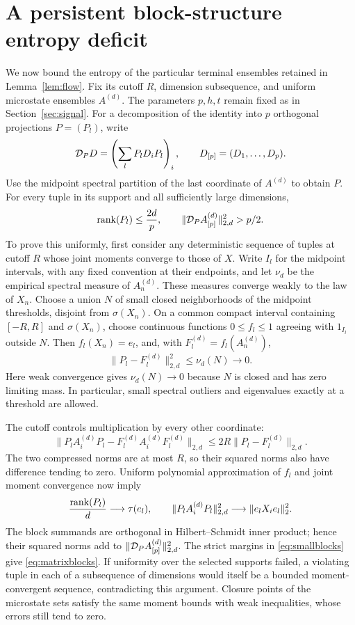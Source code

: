 \section{A persistent block-structure entropy deficit}\label{sec:blocks}

We now bound the entropy of the particular terminal ensembles retained
in Lemma~\ref{lem:flow}. Fix its cutoff $R$, dimension subsequence, and
uniform microstate ensembles $A^{(d)}$. The parameters $p,h,t$ remain
fixed as in Section~\ref{sec:signal}. For a decomposition of the identity
into $p$ orthogonal projections $P=(P_l)$, write
\[
 \mathcal D_P D=\left(\sum_l P_lD_iP_l\right)_i,
 \qquad D_{[p]}=(D_1,\ldots,D_p).
\]
Use the midpoint spectral partition of the last coordinate of $A^{(d)}$
to obtain $P$. For every tuple in its support and all sufficiently large
dimensions,
\begin{equation}\label{eq:matrixblocks}
 \operatorname{rank}(P_l)\leq\frac{2d}{p},\qquad
 \|\mathcal D_P A^{(d)}_{[p]}\|_{2,d}^2>p/2.
\end{equation}
To prove this uniformly, first consider any deterministic sequence of
tuples at cutoff $R$ whose joint moments converge to those of $X$.
Write $I_l$ for the midpoint intervals, with any fixed convention at
their endpoints, and let $\nu_d$ be the empirical spectral measure of
$A_n^{(d)}$. These measures converge weakly to the law of $X_n$.
Choose a union $N$ of small closed neighborhoods of the midpoint
thresholds, disjoint from $\sigma(X_n)$. On a common compact interval containing
$[-R,R]$ and $\sigma(X_n)$, choose continuous functions
$0\leq f_l\leq1$ agreeing with $1_{I_l}$ outside $N$. Then
$f_l(X_n)=e_l$, and, with $F_l^{(d)}=f_l(A_n^{(d)})$,
\[
 \|P_l-F_l^{(d)}\|_{2,d}^2\leq\nu_d(N)\longrightarrow0.
\]
Here weak convergence gives $\nu_d(N)\to0$ because $N$ is closed and
has zero limiting mass. In particular, small spectral outliers and
eigenvalues exactly at a threshold are allowed.

The cutoff controls multiplication by every other coordinate:
\begin{equation}\label{eq:block-outlier}
 \|P_lA_i^{(d)}P_l-F_l^{(d)}A_i^{(d)}F_l^{(d)}\|_{2,d}
 \leq2R\|P_l-F_l^{(d)}\|_{2,d}.
\end{equation}
The two compressed norms are at most $R$, so their squared norms also
have difference tending to zero. Uniform polynomial approximation of
$f_l$ and joint moment convergence now imply
\[
 \frac{\operatorname{rank}(P_l)}d\longrightarrow\tau(e_l),\qquad
 \|P_lA_i^{(d)}P_l\|_{2,d}^2
 \longrightarrow\|e_lX_i e_l\|_2^2.
\]
The block summands are orthogonal in Hilbert--Schmidt inner product;
hence their squared norms add to
$\|\mathcal D_P A^{(d)}_{[p]}\|_{2,d}^2$. The strict margins in
\eqref{eq:smallblocks} give \eqref{eq:matrixblocks}.
If uniformity over the selected supports failed, a violating tuple in
each of a subsequence of dimensions would itself be a bounded
moment-convergent sequence, contradicting this argument. Closure points
of the microstate sets satisfy the same moment bounds with weak
inequalities, whose errors still tend to zero.

